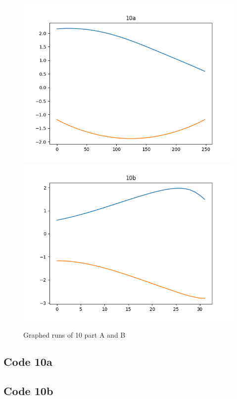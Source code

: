 \documentclass[letterpaper,11pt]{texMemo} %
\begin{document}
\begin{figure}[ht]
\caption{Graphed runs of 10 part A and B}
\centering
\includegraphics[scale=0.45]{img/10a.png}
\includegraphics[scale=0.45]{img/10b.png}
\end{figure}

\newpage
\subsection*{Code 10a}
\begin{tiny}

\end{tiny}

\subsection*{Code 10b}
\begin{tiny}

\end{tiny}
\end{document}
